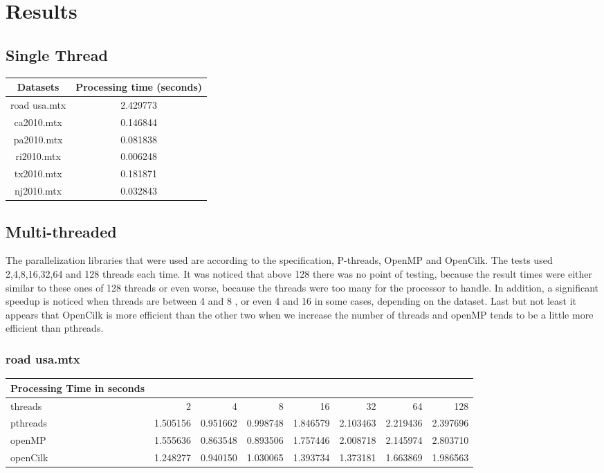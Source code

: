 \documentclass[11pt]{article}
\begin{document}
\section{Results}
\label{sec:orge2848df}
\subsection{Single Thread}
\label{sec:orgd043621}
\begin{center}
\begin{tabular}{|c|c|}
\hline
Datasets & Processing time (seconds)\\[0pt]
\hline
road usa.mtx & 2.429773\\[0pt]
ca2010.mtx & 0.146844\\[0pt]
pa2010.mtx & 0.081838\\[0pt]
ri2010.mtx & 0.006248\\[0pt]
tx2010.mtx & 0.181871\\[0pt]
nj2010.mtx & 0.032843\\[0pt]
\hline
\end{tabular}
\end{center}
\subsection{Multi-threaded}
\label{sec:org682cada}
The parallelization libraries that were used are according to the specification, P-threads, OpenMP and OpenCilk. The tests used 2,4,8,16,32,64 and 128 threads each time. It was noticed that above 128 there was no point of testing, because the result times were either similar to these ones of 128 threads or even worse, because the threads were too many for the processor to handle. In addition, a significant speedup is noticed when threads are between 4 and 8 , or even 4 and 16 in some cases, depending on the dataset. Last but not least it appears that OpenCilk is more efficient than the other two when we increase the number of threads and openMP tends to be a little more efficient than pthreads.
\subsubsection{road usa.mtx}
\label{sec:orga338989}
\begin{center}
\begin{tabular}{lrrrrrrr}
\hline
Processing Time in seconds &  &  &  &  &  &  & \\[0pt]
\hline
threads & 2 & 4 & 8 & 16 & 32 & 64 & 128\\[0pt]
\hline
pthreads & 1.505156 & 0.951662 & 0.998748 & 1.846579 & 2.103463 & 2.219436 & 2.397696\\[0pt]
openMP & 1.555636 & 0.863548 & 0.893506 & 1.757446 & 2.008718 & 2.145974 & 2.803710\\[0pt]
openCilk & 1.248277 & 0.940150 & 1.030065 & 1.393734 & 1.373181 & 1.663869 & 1.986563\\[0pt]
\hline
\end{tabular}
\end{center}
\end{document}
